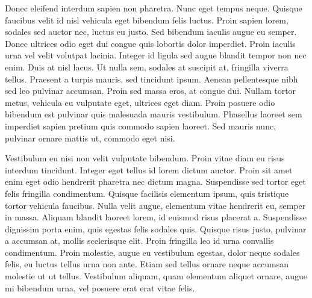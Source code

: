 Donec eleifend interdum sapien non pharetra. Nunc eget tempus neque. Quisque faucibus velit id nisl vehicula eget bibendum felis luctus. Proin sapien lorem, sodales sed auctor nec, luctus eu justo. Sed bibendum iaculis augue eu semper. Donec ultrices odio eget dui congue quis lobortis dolor imperdiet. Proin iaculis urna vel velit volutpat lacinia. Integer id ligula sed augue blandit tempor non nec enim. Duis at nisl lacus. Ut nulla sem, sodales at suscipit at, fringilla viverra tellus. Praesent a turpis mauris, sed tincidunt ipsum. Aenean pellentesque nibh sed leo pulvinar accumsan. Proin sed massa eros, at congue dui. Nullam tortor metus, vehicula eu vulputate eget, ultrices eget diam. Proin posuere odio bibendum est pulvinar quis malesuada mauris vestibulum. Phasellus laoreet sem imperdiet sapien pretium quis commodo sapien laoreet. Sed mauris nunc, pulvinar ornare mattis ut, commodo eget nisi.

Vestibulum eu nisi non velit vulputate bibendum. Proin vitae diam eu risus interdum tincidunt. Integer eget tellus id lorem dictum auctor. Proin sit amet enim eget odio hendrerit pharetra nec dictum magna. Suspendisse sed tortor eget felis fringilla condimentum. Quisque facilisis elementum ipsum, quis tristique tortor vehicula faucibus. Nulla velit augue, elementum vitae hendrerit eu, semper in massa. Aliquam blandit laoreet lorem, id euismod risus placerat a. Suspendisse dignissim porta enim, quis egestas felis sodales quis. Quisque risus justo, pulvinar a accumsan at, mollis scelerisque elit. Proin fringilla leo id urna convallis condimentum. Proin molestie, augue eu vestibulum egestas, dolor neque sodales felis, eu luctus tellus urna non ante. Etiam sed tellus ornare neque accumsan molestie ut ut tellus. Vestibulum aliquam, quam elementum aliquet ornare, augue mi bibendum urna, vel posuere erat erat vitae felis.

